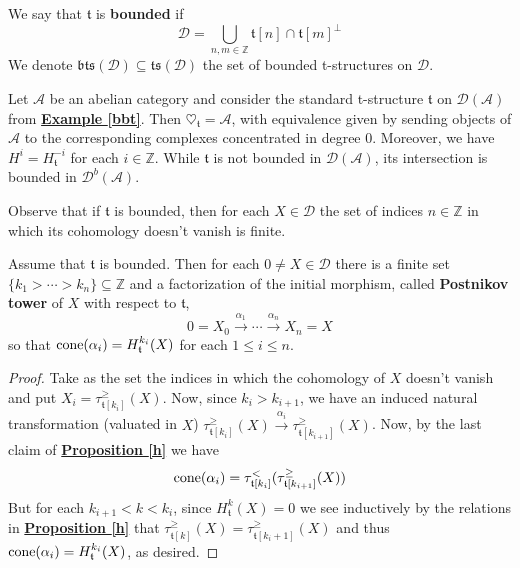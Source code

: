 \begin{defn}
We say that $\mathfrak{t}$ is \textbf{bounded} if $$\mathscr{D}=\bigcup_{n,m \in \mathbb{Z}} \mathfrak{t}[n] \cap \mathfrak{t}[m]^{\perp}$$
We denote $\mathfrak{bts}(\mathscr{D}) \subseteq \mathfrak{ts}(\mathscr{D})$ the set of bounded t-structures on $\mathscr{D}$. 
\end{defn}

\begin{exmp}
Let $\mathscr{A}$ be an abelian category and consider the standard t-structure $\mathfrak{t}$ on $\mathscr{D}(\mathscr{A})$ from \hyperref[bbt]{\textbf{Example \ref*{bbt}}}. Then $\heartsuit_{\mathfrak{t}}=\mathscr{A}$, with equivalence given by sending objects of $\mathscr{A}$ to the corresponding complexes concentrated in degree $0$. Moreover, we have $H^i=H^{-i}_{\mathfrak{t}}$ for each $i \in \mathbb{Z}$. While $\mathfrak{t}$ is not bounded in $\mathscr{D}(\mathscr{A})$, its intersection is bounded in $\mathscr{D}^b(\mathscr{A})$.
\end{exmp}

Observe that if $\mathfrak{t}$ is bounded, then for each $X \in \mathscr{D}$ the set of indices $n \in \mathbb{Z}$ in which its cohomology doesn't vanish is finite. 

\begin{prop}\label{p}
Assume that $\mathfrak{t}$ is bounded. Then for each $0 \not = X \in \mathscr{D}$ there is a finite set $\{k_1 > \cdots > k_n \} \subseteq \mathbb{Z}$ and a factorization of the initial morphism, called \textbf{Postnikov tower} of $X$ with respect to $\mathfrak{t}$, $$0=X_0 \overset{\alpha_1}{\longrightarrow} \cdots \overset{\alpha_n}{\longrightarrow} X_n=X$$ 
so that $\textnormal{cone}(\alpha_i)=H^{k_i}_{\mathfrak{t}}(X)$ for each $1 \le i \le n$. 
\end{prop}

\begin{proof}
Take as the set the indices in which the cohomology of $X$ doesn't vanish and put $X_i=\tau^{\ge}_{\mathfrak{t}[k_i]}(X)$. Now, since $k_i > k_{i+1}$, we have an induced natural transformation (valuated in $X$) $\tau^{\ge}_{\mathfrak{t}[k_i]}(X) \overset{\alpha_i}{\longrightarrow} \tau^{\ge}_{\mathfrak{t}[k_{i+1}]}(X)$. Now, by the last claim of \hyperref[h]{\textbf{Proposition \ref*{h}}} we have $$\textnormal{cone}(\alpha_i)=\tau^<_{\mathfrak{t}[k_i]}(\tau^{\ge}_{\mathfrak{t}[k_{i+1}]}(X))$$
But for each $k_{i+1}< k < k_i$, since $H^k_{\mathfrak{t}}(X)=0$ we see inductively by the relations in \hyperref[h]{\textbf{Proposition \ref*{h}}} that $\tau^{\ge}_{\mathfrak{t}[k]}(X)=\tau^{\ge}_{\mathfrak{t}[k_i+1]}(X)$ and thus $\textnormal{cone}(\alpha_i)=H^{k_i}_{\mathfrak{t}}(X)$, as desired. 
\end{proof}

